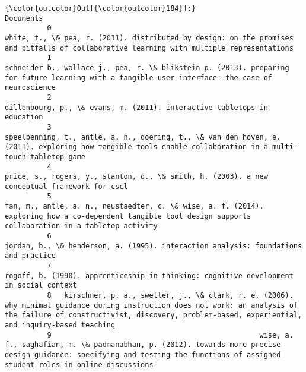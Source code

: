 \documentclass[journal,twocolumn]{IEEEtran}
\begin{document}
\begin{Verbatim}[commandchars=\\\{\}]
{\color{outcolor}Out[{\color{outcolor}184}]:}                                                                                                                                                                                                                         Documents
          0                                                                                        white, t., \& pea, r. (2011). distributed by design: on the promises and pitfalls of collaborative learning with multiple representations
          1                                                                                 schneider b., wallace j., pea, r. \& blikstein p. (2013). preparing for future learning with a tangible user interface: the case of neuroscience
          2                                                                                                                                                         dillenbourg, p., \& evans, m. (2011). interactive tabletops in education
          3                                                                       speelpenning, t., antle, a. n., doering, t., \& van den hoven, e. (2011). exploring how tangible tools enable collaboration in a multi-touch tabletop game
          4                                                                                                                                     price, s., rogers, y., stanton, d., \& smith, h. (2003). a new conceptual framework for cscl
          5                                                                    fan, m., antle, a. n., neustaedter, c. \& wise, a. f. (2014). exploring how a co-dependent tangible tool design supports collaboration in a tabletop activity
          6                                                                                                                                              jordan, b., \& henderson, a. (1995). interaction analysis: foundations and practice
          7                                                                                                                                          rogoff, b. (1990). apprenticeship in thinking: cognitive development in social context
          8   kirschner, p. a., sweller, j., \& clark, r. e. (2006). why minimal guidance during instruction does not work: an analysis of the failure of constructivist, discovery, problem-based, experiential, and inquiry-based teaching
          9                                                 wise, a. f., saghafian, m. \& padmanabhan, p. (2012). towards more precise design guidance: specifying and testing the functions of assigned student roles in online discussions

\end{Verbatim}
\end{document}
